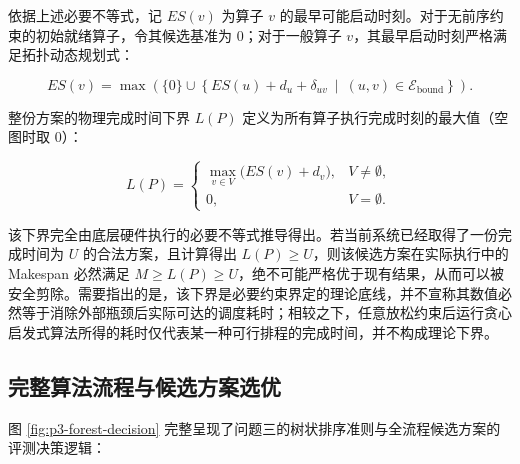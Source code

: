\documentclass[anonymous,notoc]{gmcm2026}
\begin{document}
依据上述必要不等式，记 \(ES(v)\) 为算子 \(v\) 的最早可能启动时刻。对于无前序约束的初始就绪算子，令其候选基准为 0；对于一般算子 \(v\)，其最早启动时刻严格满足拓扑动态规划式：

\begin{equation}
ES(v) = \max \left( \{0\} \cup \left\{ ES(u) + d_u + \delta_{uv} \ \middle|\ (u, v) \in \mathcal{E}_{\mathrm{bound}} \right\} \right).
\end{equation}

整份方案的物理完成时间下界 \(L(P)\) 定义为所有算子执行完成时刻的最大值（空图时取 0）：

\begin{equation}
L(P) = \begin{cases} \displaystyle \max_{v \in V} \bigl( ES(v) + d_v \bigr), & V \ne \emptyset, \\ 0, & V = \emptyset. \end{cases}
\end{equation}

该下界完全由底层硬件执行的必要不等式推导得出。若当前系统已经取得了一份完成时间为 \(U\) 的合法方案，且计算得出 \(L(P) \ge U\)，则该候选方案在实际执行中的 Makespan 必然满足 \(M \ge L(P) \ge U\)，绝不可能严格优于现有结果，从而可以被安全剪除。需要指出的是，该下界是必要约束界定的理论底线，并不宣称其数值必然等于消除外部瓶颈后实际可达的调度耗时；相较之下，任意放松约束后运行贪心启发式算法所得的耗时仅代表某一种可行排程的完成时间，并不构成理论下界。

\subsection{完整算法流程与候选方案选优}

图 \ref{fig:p3-forest-decision} 完整呈现了问题三的树状排序准则与全流程候选方案的评测决策逻辑：
\end{document}
